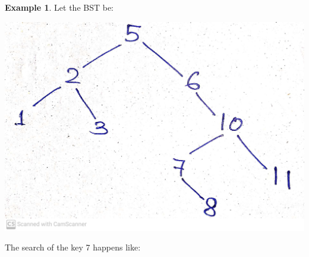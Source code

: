 \documentclass[10pt, a4paper]{extarticle}
\theoremstyle{definition}
\newtheorem{eg}{Example}
\begin{document}
	\begin{eg}
		Let the BST be:
		\begin{center}
			\includegraphics[scale=0.07]{bst1.jpg}\\
		\end{center}
		The search of the key 7 happens like:
		\begin{center}

\end{center}
\end{eg}
\end{document}
